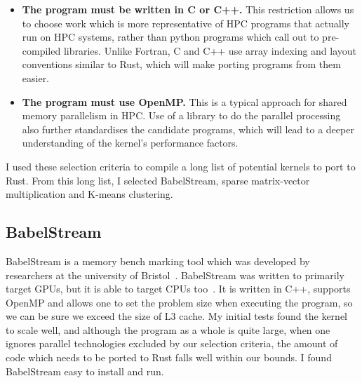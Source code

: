 \begin{itemize}
  \item \textbf{The program must be written in C or C++.} This restriction allows us to choose work which is more representative of HPC programs that actually run on HPC systems, rather than python programs which call out to pre-compiled libraries. Unlike Fortran, C and C++ use array indexing and layout conventions similar to Rust, which will make porting programs from them easier.

  \item \textbf{The program must use OpenMP.} This is a typical approach for shared memory parallelism in HPC\@. Use of a library to do the parallel processing also further standardises the candidate programs, which will lead to a deeper understanding of the kernel's performance factors.
\end{itemize}

I used these selection criteria to compile a long list of potential kernels to port to Rust. From this long list, I selected BabelStream, sparse matrix-vector multiplication and K-means clustering.

\subsection{BabelStream}

BabelStream is a memory bench marking tool which was developed by researchers at the university of Bristol~\cite{Babel2018}. BabelStream was written to primarily target GPUs, but it is able to target CPUs too~\cite{BabelStream}.
It is written in C++, supports OpenMP and allows one to set the problem size when executing the program, so we can be sure we exceed the size of L3 cache. My initial tests found the kernel to scale well, and although the program as a whole is quite large, when one ignores parallel technologies excluded by our selection criteria, the amount of code which needs to be ported to Rust falls well within our bounds. I found BabelStream easy to install and run.

